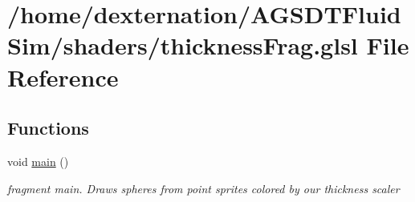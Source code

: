 \hypertarget{thickness_frag_8glsl}{\section{/home/dexternation/\-A\-G\-S\-D\-T\-Fluid\-Sim/shaders/thickness\-Frag.glsl File Reference}
\label{thickness_frag_8glsl}
}
\subsection*{Functions}
\begin{DoxyCompactItemize}
\item 
\hypertarget{thickness_frag_8glsl_acdef7a1fd863a6d3770c1268cb06add3}{void \hyperlink{thickness_frag_8glsl_acdef7a1fd863a6d3770c1268cb06add3}{main} ()}\label{thickness_frag_8glsl_acdef7a1fd863a6d3770c1268cb06add3}

\begin{DoxyCompactList}\small\item\em fragment main. Draws spheres from point sprites colored by our thickness scaler \end{DoxyCompactList}\end{DoxyCompactItemize}
